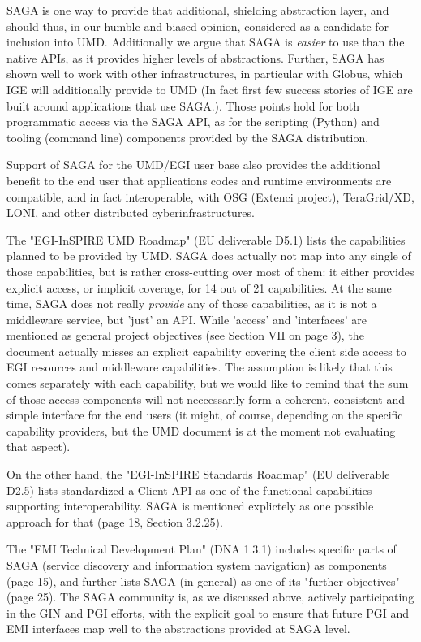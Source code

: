 \documentclass[12pt]{article}
\newcommand{\I}[1]{\textit{#1}}
\begin{document}
SAGA is one way to provide that additional, shielding abstraction
layer, and should thus, in our humble and biased opinion, considered
as a candidate for inclusion into UMD.  Additionally we argue that
SAGA is \I{easier} to use than the native APIs, as it provides higher
levels of abstractions.  Further, SAGA has shown well to work with
other infrastructures, in particular with Globus, which IGE will
additionally provide to UMD (In fact first few success stories of IGE
are built around applications that use SAGA.).  Those points hold for
both programmatic access via the SAGA API, as for the scripting
(Python) and tooling (command line) components provided by the SAGA
distribution.

Support of SAGA for the UMD/EGI user base also provides the additional
benefit to the end user that applications codes and runtime
environments are compatible, and in fact interoperable, with OSG
(Extenci project), TeraGrid/XD, LONI, and other distributed
cyberinfrastructures.

The "EGI-InSPIRE UMD Roadmap" (EU deliverable D5.1) lists the
capabilities planned to be provided by UMD.  SAGA does actually not
map into any single of those capabilities, but is rather cross-cutting
over most of them: it either provides explicit access, or implicit
coverage, for 14 out of 21 capabilities.  At the same time, SAGA does
not really \I{provide} any of those capabilities, as it is not a
middleware service, but 'just' an API.  While 'access' and
'interfaces' are mentioned as general project objectives (see Section
VII on page 3), the document actually misses an explicit capability
covering the client side access to EGI resources and middleware
capabilities.  The assumption is likely that this comes separately
with each capability, but we would like to remind that the sum of
those access components will not neccessarily form a coherent,
consistent and simple interface for the end users (it might, of
course, depending on the specific capability providers, but the UMD
document is at the moment not evaluating that aspect).

On the other hand, the "EGI-InSPIRE Standards Roadmap" (EU deliverable
D2.5) lists standardized a Client API as one of the functional
capabilities supporting interoperability.  SAGA is mentioned
explictely as one possible approach for that (page 18, Section
3.2.25).

The "EMI Technical Development Plan" (DNA 1.3.1) includes specific
parts of SAGA (service discovery and information system navigation) as
components (page 15), and further lists SAGA (in general) as one of
its "further objectives" (page 25).  The SAGA community is, as we
discussed above, actively participating in the GIN and PGI efforts,
with the explicit goal to ensure that future PGI and EMI interfaces
map well to the abstractions provided at SAGA level.
\end{document}
